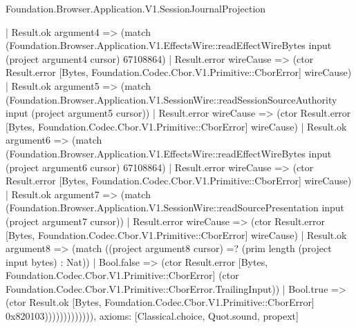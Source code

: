 \begin{lexlean}{Foundation.Browser.Application.V1.SessionJournalProjection}
\begin{semanticmodule}
{                | Result.ok argument4 => (match (Foundation.Browser.Application.V1.EffectsWire::readEffectWireBytes input (project argument4 cursor) 67108864)
                  | Result.error wireCause => (ctor Result.error [Bytes, Foundation.Codec.Cbor.V1.Primitive::CborError] wireCause)
                  | Result.ok argument5 => (match (Foundation.Browser.Application.V1.SessionWire::readSessionSourceAuthority input (project argument5 cursor))
                    | Result.error wireCause => (ctor Result.error [Bytes, Foundation.Codec.Cbor.V1.Primitive::CborError] wireCause)
                    | Result.ok argument6 => (match (Foundation.Browser.Application.V1.EffectsWire::readEffectWireBytes input (project argument6 cursor) 67108864)
                      | Result.error wireCause => (ctor Result.error [Bytes, Foundation.Codec.Cbor.V1.Primitive::CborError] wireCause)
                      | Result.ok argument7 => (match (Foundation.Browser.Application.V1.SessionWire::readSourcePresentation input (project argument7 cursor))
                        | Result.error wireCause => (ctor Result.error [Bytes, Foundation.Codec.Cbor.V1.Primitive::CborError] wireCause)
                        | Result.ok argument8 => (match ((project argument8 cursor) =? (prim length (project input bytes) : Nat))
                          | Bool.false => (ctor Result.error [Bytes, Foundation.Codec.Cbor.V1.Primitive::CborError] (ctor Foundation.Codec.Cbor.V1.Primitive::CborError.TrailingInput))
                          | Bool.true => (ctor Result.ok [Bytes, Foundation.Codec.Cbor.V1.Primitive::CborError] 0x820103))))))))))))),
  axioms: [Classical.choice, Quot.sound, propext]
}


\end{semanticmodule}
\end{lexlean}
